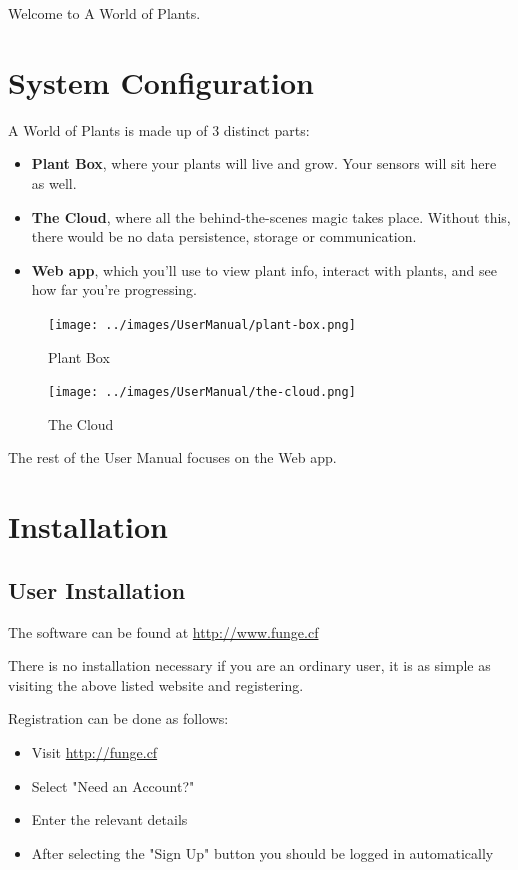 \documentclass{article}
\begin{document}
	Welcome to A World of Plants.

\section{System Configuration}
	A World of Plants is made up of 3 distinct parts:
	\begin{itemize}
		\item \textbf{Plant Box}, where your plants will live and grow. Your sensors will sit here as well.
		\item \textbf{The Cloud}, where all the behind-the-scenes magic takes place. Without this, there would be no data persistence, storage or communication.
		\item \textbf{Web app}, which you'll use to view plant info, interact with plants, and see how far you're progressing.
	\end{itemize}
	
	\begin{figure}[H]
		\texttt{[image: ../images/UserManual/plant-box.png]}
		\caption{Plant Box}
	\end{figure}
	
	\begin{figure}[H]
		\texttt{[image: ../images/UserManual/the-cloud.png]}
		\caption{The Cloud}
	\end{figure}
	
	The rest of the User Manual focuses on the Web app.
\section{Installation}
	\subsection{User Installation}
		The software can be found at \url{http://www.funge.cf}
		
		There is no installation necessary if you are an ordinary user, it is as simple as visiting the above listed website and registering.
		
		Registration can be done as follows:
		\begin{itemize}
			\item Visit \url{http://funge.cf}
			\item Select "Need an Account?"
			\item Enter the relevant details
			\item After selecting the "Sign Up" button you should be logged in automatically
		\end{itemize}
	
\end{document}
